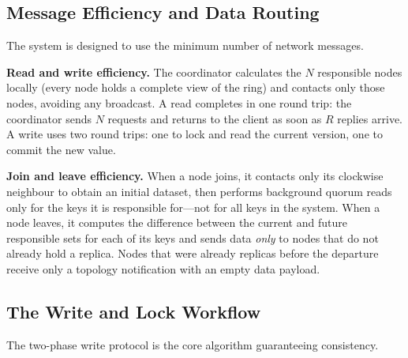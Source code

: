 \subsection{Message Efficiency and Data Routing}
The system is designed to use the minimum number of network messages.

\textbf{Read and write efficiency.}
The coordinator calculates the $N$ responsible nodes locally (every node holds
a complete view of the ring) and contacts only those nodes, avoiding any
broadcast. A read completes in one round trip: the coordinator sends $N$
requests and returns to the client as soon as $R$ replies arrive. A write uses
two round trips: one to lock and read the current version, one to commit the
new value. 

\textbf{Join and leave efficiency.}
When a node joins, it contacts only its clockwise neighbour to obtain an
initial dataset, then performs background quorum reads only for the keys it is
responsible for---not for all keys in the system. When a node leaves, it
computes the difference between the current and future responsible sets for
each of its keys and sends data \emph{only} to nodes that do not already hold a
replica. Nodes that were already replicas before the departure receive only a
topology notification with an empty data payload.

\subsection{The Write and Lock Workflow}
The two-phase write protocol is the core algorithm guaranteeing consistency.


